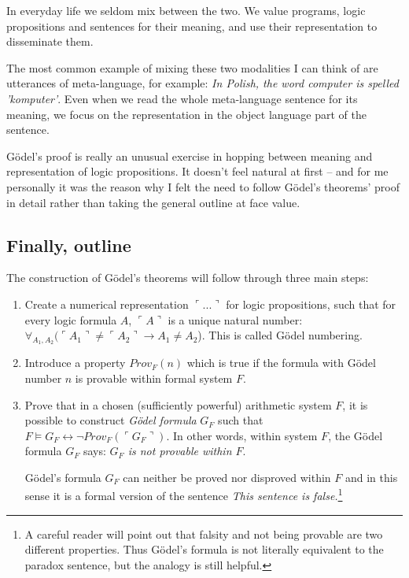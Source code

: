 \documentclass{article}
\begin{document}
In everyday life we seldom mix between the two. We value programs, logic propositions
and sentences for their meaning, and use their representation to disseminate them.

The most common example of mixing these two modalities I can think of are utterances of
meta-language, for example: \textit{In Polish, the word computer is spelled 'komputer'}.
Even when we read the whole meta-language sentence for its meaning, we focus on the
representation in the object language part of the sentence.

Gödel's proof is really an unusual exercise in hopping between meaning and representation
of logic propositions. It doesn't feel natural at first -- and for me personally it was
the reason why I felt the need to follow Gödel's theorems' proof in detail rather than
taking the general outline at face value.

\subsection{Finally, outline}

The construction of Gödel's theorems will follow through three main steps:

\begin{enumerate}
    \item Create a numerical representation $\ulcorner ... \urcorner$ for logic propositions,
        such that for every logic formula $A$, $\ulcorner A \urcorner$ is a unique natural number:
        $\forall_{A_1, A_2} (\ulcorner A_1 \urcorner \neq \ulcorner A_2 \urcorner
        \rightarrow A_1 \neq A_2$). This is called Gödel numbering.
    \item Introduce a property $Prov_F(n)$ which is true if the formula with Gödel number $n$
        is provable within formal system $F$.
    \item Prove that in a chosen (sufficiently powerful) arithmetic system $F$,
        it is possible to construct \textit{Gödel formula} $G_F$ such that
        $F \models G_F \leftrightarrow \neg Prov_F(\ulcorner G_F \urcorner)$. In other words, within system
        $F$, the Gödel formula $G_F$ says: \textit{$G_F$ is not provable within $F$}.

        Gödel's formula $G_F$ can neither be proved nor disproved within $F$ and in this
        sense it is a formal version of the sentence \textit{This sentence is false.}\footnote{
            A careful reader will point out that falsity and not being provable are two different
            properties. Thus Gödel's formula is not literally equivalent to the
            paradox sentence, but the analogy is still helpful.
        }
\end{enumerate}
\end{document}
